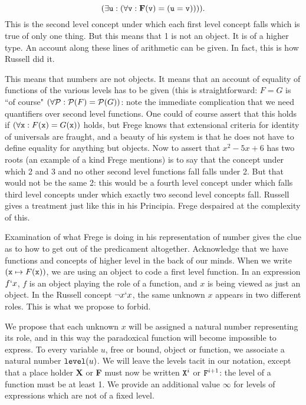 \documentclass[12pt]{article}
\begin{document}
$$(\exists {\tt u}:(\forall {\tt v}:{\bf F}({\tt v}) = ({\tt u}={\tt v})))).$$  This is the second level concept under which each first level concept falls which is true of only one thing.  But this means that 1 is not an object.  It is of a higher type.  An account along these lines of arithmetic can be given.  In fact, this is how Russell did it.  

This means that numbers are not objects.  It means that an account of equality of functions of the various levels has to be given (this is straightforward:  $F=G$ is ``of course"
$(\forall {\tt \cal P}:{\tt \cal P}(F) = {\tt \cal P}(G))$:  note the immediate complication that we need quantifiers over second level functions.  One could of course assert that this holds if
$(\forall {\tt x}:F({\tt x})=G({\tt x}))$ holds, but Frege knows that extensional criteria for identity of universals are fraught, and a beauty of his system is that he does not have to define equality for anything but objects.    Now to assert that $x^2-5x+6$ has two roots (an example of a kind Frege mentions) is to say that the concept under which 2 and 3 and no other second level functions fall falls under 2.  But that would not be the same 2:  this would be a fourth level concept under which falls third level concepts under which exactly two second level concepts fall.  Russell gives a treatment just like this in his Principia.  Frege despaired at the complexity of this.

Examination of what Frege is doing in his representation of number gives the clue as to how to get out of the predicament altogether.  Acknowledge that we have functions and concepts of higher level in the back of our minds.  When we write $({\tt x} \mapsto F({\tt x}))$, we are using an object to code a first level function.  In an expression $f`x$, $f$ is an object playing the role of a function, and $x$ is being viewed as just an object.
In the Russell concept $\neg x`x$, the same unknown $x$ appears in two different roles.  This is what we propose to forbid.

We propose that each unknown $x$ will be assigned a natural number representing its role, and in this way the paradoxical function will become impossible to express.  To every variable $u$, free or bound, object or function, we associate a natural number ${\tt level}(u)$.  We will leave the levels tacit in our notation, except that a place holder {\bf X} or {\bf F} must now be written ${\tt X}^i$ or ${\tt F}^{i+1}$:  the level of a function must be at least 1.  We provide an additional value $\infty$ for levels of expressions which are not of a fixed level.
\end{document}
